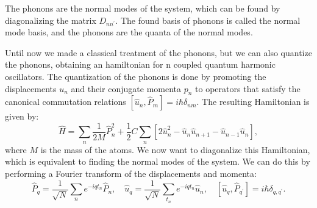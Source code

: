 The phonons are the normal modes of the system, which can be found by diagonalizing the matrix \(D_{nn^{\prime}}\). The found basis of phonons is called the normal mode basis, and the phonons are the quanta of the normal modes.

Until now we made a classical treatment of the phonons, but we can also quantize the phonons, obtaining an hamiltonian for n coupled quantum harmonic oscillators. The quantization of the phonons is done by promoting the displacements \(u_n\) and their conjugate momenta \(p_n\) to operators that satisfy the canonical commutation relations \([\hat{u}_n, \hat{P}_m] = i \hbar \delta_{nm}\). The resulting Hamiltonian is given by:
\[
    \hat{H} = \sum_{n} \frac{1}{2M} \hat{P}_n^2 + \frac{1}{2} C \sum_{n} \left[ 2\hat{u}_n^2 - \hat{u}_n \hat{u}_{n+1} - \hat{u}_{n-1} \hat{u}_n \right],
\]
where \(M\) is the mass of the atoms. We now want to diagonalize this Hamiltonian, which is equivalent to finding the normal modes of the system. We can do this by performing a Fourier transform of the displacements and momenta:
\[
    \hat{P}_q = \frac{1}{\sqrt{N}} \sum_{n} e^{-i q t_n} \hat{P}_n, \quad \hat{u}_q = \frac{1}{\sqrt{N}} \sum_{t_n} e^{-i q t_n} \hat{u}_n, \quad [\hat{u}_q, \hat{P}_{q^{\prime}}] = i \hbar \delta_{q, q^{\prime}}.
\]

